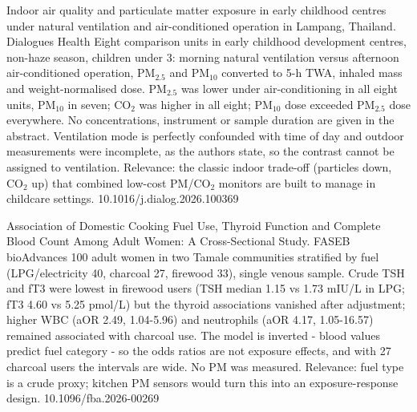 \documentclass[10pt]{article}
\begin{document}
{Indoor air quality and particulate matter exposure in early childhood centres under natural ventilation and air-conditioned operation in Lampang, Thailand.}
{Dialogues Health}
{Eight comparison units in early childhood development centres, non-haze season, children under 3: morning natural ventilation versus afternoon air-conditioned operation, PM$_{2.5}$ and PM$_{10}$ converted to 5-h TWA, inhaled mass and weight-normalised dose. PM$_{2.5}$ was lower under air-conditioning in all eight units, PM$_{10}$ in seven; CO$_2$ was higher in all eight; PM$_{10}$ dose exceeded PM$_{2.5}$ dose everywhere. No concentrations, instrument or sample duration are given in the abstract. Ventilation mode is perfectly confounded with time of day and outdoor measurements were incomplete, as the authors state, so the contrast cannot be assigned to ventilation. Relevance: the classic indoor trade-off (particles down, CO$_2$ up) that combined low-cost PM/CO$_2$ monitors are built to manage in childcare settings.}
{10.1016/j.dialog.2026.100369}

{Association of Domestic Cooking Fuel Use, Thyroid Function and Complete Blood Count Among Adult Women: A Cross-Sectional Study.}
{FASEB bioAdvances}
{100 adult women in two Tamale communities stratified by fuel (LPG/electricity 40, charcoal 27, firewood 33), single venous sample. Crude TSH and fT3 were lowest in firewood users (TSH median 1.15 vs 1.73 mIU/L in LPG; fT3 4.60 vs 5.25 pmol/L) but the thyroid associations vanished after adjustment; higher WBC (aOR 2.49, 1.04-5.96) and neutrophils (aOR 4.17, 1.05-16.57) remained associated with charcoal use. The model is inverted - blood values predict fuel category - so the odds ratios are not exposure effects, and with 27 charcoal users the intervals are wide. No PM was measured. Relevance: fuel type is a crude proxy; kitchen PM sensors would turn this into an exposure-response design.}
{10.1096/fba.2026-00269}

\par{}\baselineskip{}\baselineskip
{}
\end{document}
